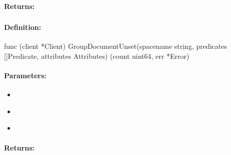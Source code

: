 \paragraph{Returns:}


\pagebreak
\subsubsection{}
\label{api:Go:GroupDocumentUnset}


\paragraph{Definition:}
\begin{gocode}
func (client *Client) GroupDocumentUnset(spacename string, predicates []Predicate, attributes Attributes) (count uint64, err *Error)
\end{gocode}

\paragraph{Parameters:}
\begin{itemize}[noitemsep]
\item {}\\

\item {}\\

\item {}\\

\end{itemize}

\paragraph{Returns:}


\pagebreak
\subsubsection{}
\label{api:Go:MapAdd}


